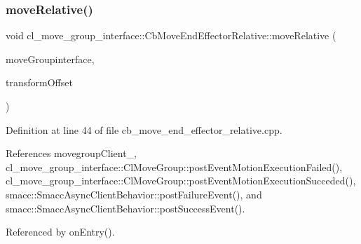 \subsubsection{\texorpdfstring{move\+Relative()}{moveRelative()}}
{\footnotesize\ttfamily void cl\+\_\+move\+\_\+group\+\_\+interface\+::\+Cb\+Move\+End\+Effector\+Relative\+::move\+Relative (\begin{DoxyParamCaption}\item[{moveit\+::planning\+\_\+interface\+::\+Move\+Group\+Interface \&}]{move\+Groupinterface,  }\item[{geometry\+\_\+msgs\+::\+Transform \&}]{transform\+Offset }\end{DoxyParamCaption})\hspace{0.3cm}{\ttfamily [protected]}}



Definition at line 44 of file cb\+\_\+move\+\_\+end\+\_\+effector\+\_\+relative.\+cpp.



References movegroup\+Client\+\_\+, cl\+\_\+move\+\_\+group\+\_\+interface\+::\+Cl\+Move\+Group\+::post\+Event\+Motion\+Execution\+Failed(), cl\+\_\+move\+\_\+group\+\_\+interface\+::\+Cl\+Move\+Group\+::post\+Event\+Motion\+Execution\+Succeded(), smacc\+::\+Smacc\+Async\+Client\+Behavior\+::post\+Failure\+Event(), and smacc\+::\+Smacc\+Async\+Client\+Behavior\+::post\+Success\+Event().



Referenced by on\+Entry().


